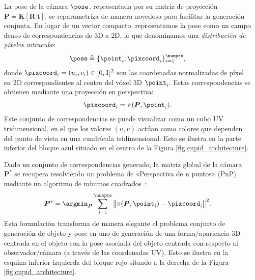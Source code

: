 \documentclass[../../book-main_es.tex]{subfiles}
\begin{document}
La pose de la cámara $\pose$, representada por su matriz de proyección
$\boldsymbol{P} = \boldsymbol{K}[\boldsymbol{R}|\boldsymbol{t}]$, se reparametriza
de manera novedosa para facilitar la generación conjunta. En lugar de un
vector compacto, representamos la pose como un campo denso de correspondencias de 3D a 2D,
lo que denominamos una \textit{distribución de píxeles intracubo}:
\[
\pose \triangleq \{\point_i, \pixcoord_i\}_{i=1}^{\numpts},
\]
donde $\pixcoord_i = (u_i, v_i) \in [0,1]^2$ son las coordenadas normalizadas 
de píxel en 2D correspondientes al centro del vóxel 3D $\point_i$.
Estas correspondencias se obtienen mediante una proyección en perspectiva:
\[
\pixcoord_i = \pi(\boldsymbol{P}, \point_i).
\]
Este conjunto de correspondencias se puede visualizar como un cubo UV tridimensional, en el que
los valores $(u,v)$ actúan como colores que dependen del punto de vista en una cuadrícula tridimensional. Esto
se ilustra en la parte inferior del bloque azul situado en el centro de
la Figura \ref{fig:cupid_architecture}.

Dado un conjunto de correspondencias generado, la matriz global de la cámara
$\boldsymbol{P}^{*}$ se recupera resolviendo un problema de «Perspectiva de n puntos»
(PnP) mediante un algoritmo de mínimos cuadrados~\citep{abdel2015direct}:
\begin{equation}
\boldsymbol{P}^{*} = \argmin_{\boldsymbol{P}} \sum_{i=1}^{\numpts}
\big\|\pi(\boldsymbol{P},\point_i) - \pixcoord_i\big\|^2.
\label{eq:pnp}
\end{equation}
Esta formulación transforma de manera elegante el problema conjunto de generación de objeto y pose 
en uno de generación de una forma/apariencia 3D centrada en el objeto
con la pose asociada del objeto centrada con respecto al observador/cámara (a través de las coordenadas UV).
Esto se ilustra en la esquina inferior izquierda del bloque rojo situado a la derecha de la Figura
\ref{fig:cupid_architecture}.
\end{document}
